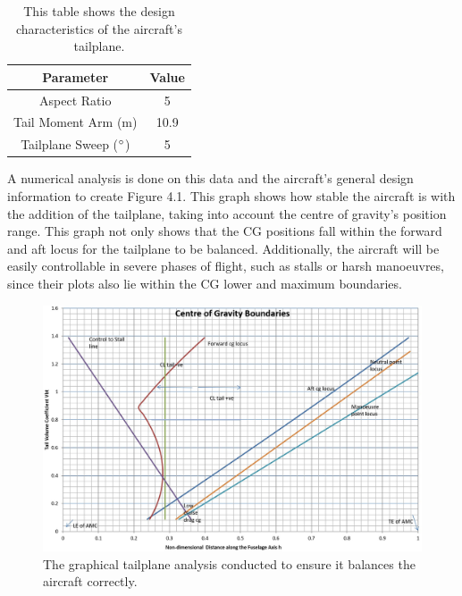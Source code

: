 \documentclass[stu, a4paper, 12pt, floatsintext]{apa7}
\numberwithin{figure}{section}
\numberwithin{table}{section}
\numberwithin{equation}{section}
\begin{document}
\begin{table}[H]
    \centering
    \caption{This table shows the design characteristics of the aircraft's tailplane. }
    \label{tab:tailplane_table}
    \begin{tabular}{@{}cc@{}}
    \toprule
    \textbf{Parameter}         & \textbf{Value} \\ \midrule
    Aspect Ratio               & 5              \\
    Tail Moment Arm (m)        & 10.9           \\
    Tailplane Sweep ($\degree$) & 5              \\ \bottomrule
    \end{tabular}
\end{table}

A numerical analysis is done on this data and the aircraft’s general design information to create Figure 4.1. This graph shows how stable the aircraft is with the addition of the tailplane, taking into account the centre of gravity’s position range. This graph not only shows that the CG positions fall within the forward and aft locus for the tailplane to be balanced. Additionally, the aircraft will be easily controllable in severe phases of flight, such as stalls or harsh manoeuvres, since their plots also lie within the CG lower and maximum boundaries. 

\begin{figure}[H]
    \caption{The graphical tailplane analysis conducted to ensure it balances the aircraft correctly.}
    \label{fig:tailplane}
    \centering
    \includegraphics[width=1.1\textwidth]{pictures/tailplane_analysis.jpg}
\end{figure}
\end{document}
